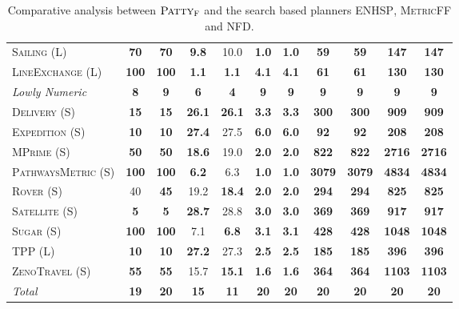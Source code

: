 \documentclass[11pt]{article}
\newcommand{\pattyf}{\ensuremath{\textsc{Patty}_\textsc{F}}\xspace}
\begin{document}
\begin{table}[tb]
{\begin{tabular}{|l||cc||cc||cc||cc||cc||}
\textsc{Sailing} (L)&\textbf{70}&\textbf{70}&\textbf{9.8}&10.0&\textbf{1.0}&\textbf{1.0}&\textbf{59}&\textbf{59}&\textbf{147}&\textbf{147}\\
\textsc{LineExchange} (L)&\textbf{100}&\textbf{100}&\textbf{1.1}&\textbf{1.1}&\textbf{4.1}&\textbf{4.1}&\textbf{61}&\textbf{61}&\textbf{130}&\textbf{130}
\\\hline
\textit{Lowly Numeric}&\textbf{8}&\textbf{9}&\textbf{6}&\textbf{4}&\textbf{9}&\textbf{9}&\textbf{9}&\textbf{9}&\textbf{9}&\textbf{9}\\\hline
\textsc{Delivery} (S)&\textbf{15}&\textbf{15}&\textbf{26.1}&\textbf{26.1}&\textbf{3.3}&\textbf{3.3}&\textbf{300}&\textbf{300}&\textbf{909}&\textbf{909}\\
\textsc{Expedition} (S)&\textbf{10}&\textbf{10}&\textbf{27.4}&27.5&\textbf{6.0}&\textbf{6.0}&\textbf{92}&\textbf{92}&\textbf{208}&\textbf{208}\\
\textsc{MPrime} (S)&\textbf{50}&\textbf{50}&\textbf{18.6}&19.0&\textbf{2.0}&\textbf{2.0}&\textbf{822}&\textbf{822}&\textbf{2716}&\textbf{2716}\\
\textsc{PathwaysMetric} (S)&\textbf{100}&\textbf{100}&\textbf{6.2}&6.3&\textbf{1.0}&\textbf{1.0}&\textbf{3079}&\textbf{3079}&\textbf{4834}&\textbf{4834}\\
\textsc{Rover} (S)&40&\textbf{45}&19.2&\textbf{18.4}&\textbf{2.0}&\textbf{2.0}&\textbf{294}&\textbf{294}&\textbf{825}&\textbf{825}\\
\textsc{Satellite} (S)&\textbf{5}&\textbf{5}&\textbf{28.7}&28.8&\textbf{3.0}&\textbf{3.0}&\textbf{369}&\textbf{369}&\textbf{917}&\textbf{917}\\
\textsc{Sugar} (S)&\textbf{100}&\textbf{100}&7.1&\textbf{6.8}&\textbf{3.1}&\textbf{3.1}&\textbf{428}&\textbf{428}&\textbf{1048}&\textbf{1048}\\
\textsc{TPP} (L)&\textbf{10}&\textbf{10}&\textbf{27.2}&27.3&\textbf{2.5}&\textbf{2.5}&\textbf{185}&\textbf{185}&\textbf{396}&\textbf{396}\\
\textsc{ZenoTravel} (S)&\textbf{55}&\textbf{55}&15.7&\textbf{15.1}&\textbf{1.6}&\textbf{1.6}&\textbf{364}&\textbf{364}&\textbf{1103}&\textbf{1103}
\\\hline
\textit{Total}&\textbf{19}&\textbf{20}&\textbf{15}&\textbf{11}&\textbf{20}&\textbf{20}&\textbf{20}&\textbf{20}&\textbf{20}&\textbf{20}\\\hline

        \end{tabular}}
        \caption{Comparative analysis between \pattyf and the search based planners \textsc{ENHSP}, \textsc{MetricFF} and \textsc{NFD}.}
        \label{tab:exp-search}
        \end{table}
        
\end{document}
